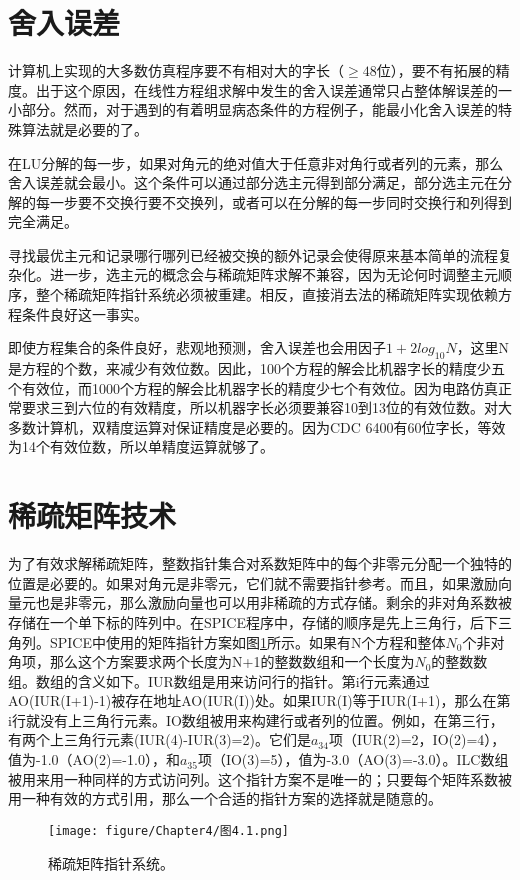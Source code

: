 \section{舍入误差}
计算机上实现的大多数仿真程序要不有相对大的字长（$\ge 48$位），要不有拓展的精度。出于这个原因，在线性方程组求解中发生的舍入误差通常只占整体解误差的一小部分。然而，对于遇到的有着明显病态条件的方程例子，能最小化舍入误差的特殊算法就是必要的了\cite{ref-49,ref-50}。

在LU分解的每一步，如果对角元的绝对值大于任意非对角行或者列的元素，那么舍入误差就会最小。这个条件可以通过部分选主元得到部分满足，部分选主元在分解的每一步要不交换行要不交换列，或者可以在分解的每一步同时交换行和列得到完全满足。

寻找最优主元和记录哪行哪列已经被交换的额外记录会使得原来基本简单的流程复杂化。进一步，选主元的概念会与稀疏矩阵求解不兼容，因为无论何时调整主元顺序，整个稀疏矩阵指针系统必须被重建。相反，直接消去法的稀疏矩阵实现依赖方程条件良好这一事实。

即使方程集合的条件良好，悲观地预测，舍入误差也会用因子$1+2log_{10}N$，这里N是方程的个数\cite{ref-49}，来减少有效位数。因此，100个方程的解会比机器字长的精度少五个有效位，而1000个方程的解会比机器字长的精度少七个有效位。因为电路仿真正常要求三到六位的有效精度，所以机器字长必须要兼容10到13位的有效位数。对大多数计算机，双精度运算对保证精度是必要的。因为CDC 6400有60位字长，等效为14个有效位数，所以单精度运算就够了。

\section{稀疏矩阵技术}
为了有效求解稀疏矩阵，整数指针集合对系数矩阵中的每个非零元分配一个独特的位置是必要的。如果对角元是非零元，它们就不需要指针参考。而且，如果激励向量元也是非零元，那么激励向量也可以用非稀疏的方式存储。剩余的非对角系数被存储在一个单下标的阵列中。在SPICE程序中，存储的顺序是先上三角行，后下三角列。SPICE中使用的矩阵指针方案如图\ref{图4.1}所示。如果有N个方程和整体$N_0$个非对角项，那么这个方案要求两个长度为N+1的整数数组和一个长度为$N_0$的整数数组。数组的含义如下。IUR数组是用来访问行的指针。第i行元素通过AO(IUR(I+1)-1)被存在地址AO(IUR(I))处。如果IUR(I)等于IUR(I+1)，那么在第i行就没有上三角行元素。IO数组被用来构建行或者列的位置。例如，在第三行，有两个上三角行元素(IUR(4)-IUR(3)=2)。它们是$a_{34}$项（IUR(2)=2，IO(2)=4），值为-1.0（AO(2)=-1.0），和$a_{35}$项（IO(3)=5），值为-3.0（AO(3)=-3.0）。ILC数组被用来用一种同样的方式访问列。这个指针方案不是唯一的；只要每个矩阵系数被用一种有效的方式引用，那么一个合适的指针方案的选择就是随意的。
\begin{figure}[htbp]
\small
    \centering
    \texttt{[image: figure/Chapter4/图4.1.png]}
    \caption{稀疏矩阵指针系统。}
    \label{图4.1}
\end{figure}

